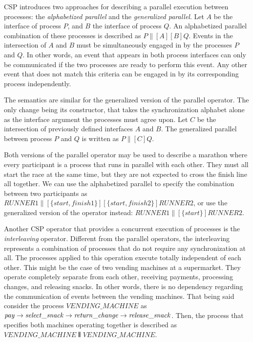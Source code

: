 CSP introduces two approaches for describing a parallel execution between processes: the \emph{alphabetized parallel} and the \emph{generalized parallel}. Let $ A $ be the interface of process $ P $, and $ B $ the interface of process $ Q $. An alphabetized parallel combination of these processes is described as $ P \parallel[A][B] Q $. Events in the intersection of $ A $ and $ B $ must be simultaneously engaged in by the processes $ P $ and $ Q $. In other words, an event that appears in both process interfaces can only be communicated if the two processes are ready to perform this event. Any other event that does not match this criteria can be engaged in by its corresponding process independently.

The semantics are similar for the generalized version of the parallel operator. The only change being its constructor, that takes the synchronization alphabet alone as the interface argument the processes must agree upon. Let $ C $ be the intersection of previously defined interfaces $ A $ and $ B $. The generalized parallel between process $ P $ and $ Q $ is written as $ P \parallel[C] Q $.

Both versions of the parallel operator may be used to describe a marathon where every participant is a process that runs in parallel with each other. They must all start the race at the same time, but they are not expected to cross the finish line all together. We can use the alphabetized parallel to specify the combination between two participants as $ \mathit{RUNNER1} \parallel[\{start, finish1\}][\{start, finish2\}] \mathit{RUNNER2} $, or use the generalized version of the operator instead: $ \mathit{RUNNER1} \parallel[\{start\}] \mathit{RUNNER2} $.

Another CSP operator that provides a concurrent execution of processes is the \emph{interleaving} operator. Different from the parallel operators, the interleaving represents a combination of processes that do not require any synchronization at all. The processes applied to this operation execute totally independent of each other. This might be the case of two vending machines at a supermarket. They operate completely separate from each other, receiving payments, processing changes, and releasing snacks. In other words, there is no dependency regarding the communication of events between the vending machines. That being said consider the process $ \mathit{VENDING\_MACHINE} $ as $ \mathit{pay} \mathrel{\rightarrow} \mathit{select\_snack} \mathrel{\rightarrow} \mathit{return\_change} \mathrel{\rightarrow} \mathit{release\_snack} $. Then, the process that specifies both machines operating together is described as $ \mathit{VENDING\_MACHINE} \interleave \mathit{VENDING\_MACHINE} $.

